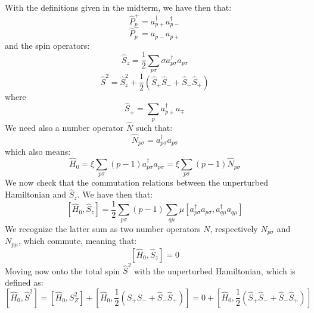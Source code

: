 \documentclass{article}
\begin{document}
\section{}
With the definitions given in the midterm, we have then that:
\begin{equation*}
    \hat P _p ^+ = a_{p+}^\dagger a_{p-}^\dagger
\end{equation*}
\begin{equation*}
    \hat P _p^- = a_{p-} a_{p+}
\end{equation*}
and the spin operators:
\begin{equation*}
    \hat S_z = \frac{1}{2} \sum_{p\sigma} \sigma a_{p \sigma}^\dagger a_{p \sigma}
\end{equation*}
\begin{equation*}
    \hat S^2 = \hat S_z^2 + \frac{1}{2} \left(\hat S_+ \hat S_- + \hat S_- \hat S_+ \right)
\end{equation*}
where
\begin{equation*}
    \hat S_\pm = \sum_p a_{p\pm}^\dagger a_{\mp}
\end{equation*}
We need also a number operator $\hat N$ such that:
\begin{equation*}
    \hat N_{p \sigma} = a_{p \sigma}^\dagger a_{p\sigma}
\end{equation*}
which also means:
\begin{equation*}
    \hat H_0 = \xi \sum_{p \sigma} (p - 1) a_{p \sigma}^\dagger a_{p\sigma} = \xi \sum_{p \sigma} (p-1) \hat N_{p \sigma}
\end{equation*}
We now check that the commutation relations between the unperturbed Hamiltonian and $\hat S_z$. We have then that:
\begin{equation*}
    \left[\hat H_0, \hat S_z \right] = \frac{1}{2} \sum_{p\sigma} (p-1) \sum_{q \mu} \mu \left[a_{p\sigma}^\dagger a_{p \sigma}, a_{q \mu}^\dagger a_{q \mu} \right]
\end{equation*}
We recognize the latter sum as two number operators $N$, respectively $N_{p\sigma}$ and $N_{p\mu}$, which commute, meaning that:
\begin{equation}
    \left[ \hat H_0, \hat S_z \right] = 0
\end{equation}
Moving now onto the total spin $\hat S^2$ with the unperturbed Hamiltonian, which is defined as:
\begin{equation*}
    \left[ \hat H_0, \hat S^2 \right] = \left[\hat H_0, S_Z^2 \right] + \left[\hat H_0, \frac{1}{2} \left(\hat S_+ \hat S_- + \hat S_- \hat S_+\right) \right] = 0 + \left[\hat H_0, \frac{1}{2} \left(\hat S_+ \hat S_- + \hat S_- \hat S_+\right) \right]
\end{equation*}
\end{document}
